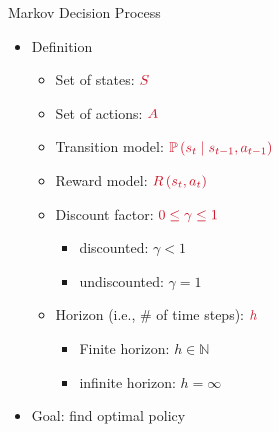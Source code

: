 \documentclass[11pt,table]{beamer}
\begin{document}
\begin{frame}{Markov Decision Process}

\begin{itemize}
    

\item Definition

\begin{itemize}
     

\item Set of states: $\textcolor{red1}{S}$
\item Set of actions: $\textcolor{red1}{A}$
\item Transition model: $\textcolor{red1}{\mathbb{P}\left(s_{t} \mid s_{t-1}, a_{t-1}\right)}$
\item Reward model: $\textcolor{red1}{R\left(s_{t}, a_{t}\right)}$
\item Discount factor: $\textcolor{red1}{0 \leq \gamma \leq 1}$
\begin{itemize}
\item discounted: $\gamma<1$
\item undiscounted: $\gamma=1$
\end{itemize}
\item Horizon (i.e., \# of time steps): $\textcolor{red1}{h}$
\begin{itemize}
\item Finite horizon: $h \in \mathbb{N}$
\item infinite horizon: $h=\infty$
\end{itemize}
\end{itemize}
\item  Goal: \textcolor{red1}{find optimal policy}
\end{itemize}

\end{frame}
\end{document}
